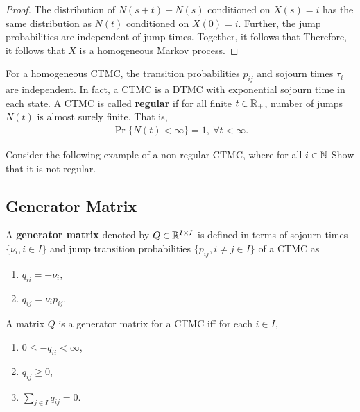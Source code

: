 \documentclass[a4paper,10pt,english]{article}
\begin{document}
\begin{proof}
The distribution of $N(s+t) - N(s)$ conditioned on $X(s) = i$ has 
the same distribution as $N(t)$ conditioned on $X(0) = i$. 
Further, the jump probabilities are independent of jump times. 
Together, it follows that
Therefore, it follows that $X$ is a homogeneous Markov process. 
\end{proof}
For a homogeneous CTMC, the transition probabilities $p_{ij}$ and sojourn times $\tau_i$ are independent. 
In fact, a CTMC is a DTMC with exponential sojourn time in each state. 
A CTMC is called \textbf{regular} if for all finite $t \in \mathbb{R}_+$, number of jumps $N(t)$ is almost surely finite. 
That is, 
\begin{align*}
\Pr\{ N(t) < \infty \} = 1,~ \forall t < \infty.
\end{align*} 
\begin{shaded*}
Consider the following example of a non-regular CTMC, where for all $i \in \mathbb{N}$
Show that it is not regular.
\end{shaded*}

\subsection{Generator Matrix}
A \textbf{generator matrix} denoted by $Q \in \mathbb{R}^{I \times I}$ is defined in terms of sojourn times $\{\nu_i, i \in I\}$ and jump transition probabilities $\{p_{ij}, i \neq j \in I\}$ of a CTMC as
\begin{enumerate}
\item $q_{ii}= -\nu_i$,
\item $q_{ij}=\nu_i p_{ij}$. 
\end{enumerate}
\begin{lem} A matrix $Q$ is a generator matrix for a CTMC iff for each $i \in I$,
 \begin{enumerate}
\item $0 \leq -q_{ii} < \infty$, 
\item $q_{ij} \geq 0$,
\item $\sum_{j \in I}q_{ij}=0$.
\end{enumerate}
\end{lem}
\end{document}
